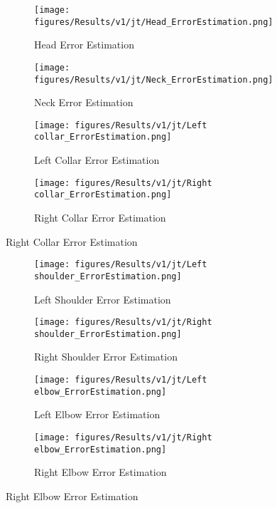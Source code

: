 \begin{figure}[!ht]
  \centering
  \begin{subfigure}[b]{0.47\linewidth}
      \centering
      \texttt{[image: figures/Results/v1/jt/Head\_ErrorEstimation.png]}
      \caption{Head Error Estimation}
      \label{fig:v1_head_jt_ee}
  \end{subfigure}
  \hfill
  \begin{subfigure}[b]{0.47\linewidth}
      \centering
      \texttt{[image: figures/Results/v1/jt/Neck\_ErrorEstimation.png]}
      \caption{Neck Error Estimation}
      \label{fig:v1_neck_jt_ee}
  \end{subfigure}
  \hfill
  \begin{subfigure}[b]{0.47\linewidth}
      \centering
      \texttt{[image: figures/Results/v1/jt/Left collar\_ErrorEstimation.png]}
      \caption{Left Collar Error Estimation}
      \label{fig:v1_leco_jt_ee}
  \end{subfigure}
  \hfill
  \begin{subfigure}[b]{0.47\linewidth}
      \centering
      \texttt{[image: figures/Results/v1/jt/Right collar\_ErrorEstimation.png]}
      \caption{Right Collar Error Estimation}
      \label{fig:v1_rico_jt_ee}
  \end{subfigure}
\end{figure}


\begin{figure}[!ht]
  \centering
  \begin{subfigure}[b]{0.47\linewidth}
      \centering
      \texttt{[image: figures/Results/v1/jt/Left shoulder\_ErrorEstimation.png]}
      \caption{Left Shoulder Error Estimation}
      \label{fig:v1_lesh_jt_ee}
  \end{subfigure}
  \hfill
  \begin{subfigure}[b]{0.47\linewidth}
      \centering
      \texttt{[image: figures/Results/v1/jt/Right shoulder\_ErrorEstimation.png]}
      \caption{Right Shoulder Error Estimation}
      \label{fig:v1_rish_jt_ee}
  \end{subfigure}
  \hfill
  \begin{subfigure}[b]{0.47\linewidth}
      \centering
      \texttt{[image: figures/Results/v1/jt/Left elbow\_ErrorEstimation.png]}
      \caption{Left Elbow Error Estimation}
      \label{fig:v1_leel_jt_ee}
  \end{subfigure}
  \hfill
  \begin{subfigure}[b]{0.47\linewidth}
      \centering
      \texttt{[image: figures/Results/v1/jt/Right elbow\_ErrorEstimation.png]}
      \caption{Right Elbow Error Estimation}
      \label{fig:v1_reel_jt_ee}
  \end{subfigure}
\end{figure}



